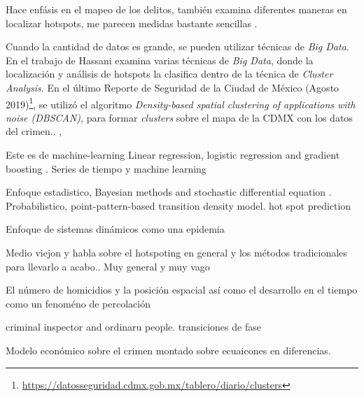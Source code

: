 \documentclass[onecolumn,12pt,letterpaper]{article}
\begin{document}
Hace enfásis en el mapeo de los delitos, también examina diferentes maneras en localizar hotspots, me parecen medidas bastante sencillas \cite{ratcliffe_crime_2010}. 


Cuando la cantidad de datos es grande, se pueden utilizar técnicas de \textit{Big Data}. En el trabajo de Hassani\cite{hassani_review_2016} examina varias técnicas de \textit{Big Data}, donde  la localización y análisis de hotspots la clasifica dentro de la técnica de \textit{Cluster Analysis}. En el último Reporte de Seguridad de la Ciudad de México (Agosto 2019)\footnote{\url{https://datosseguridad.cdmx.gob.mx/tablero/diario/clusters}}, se utilizó el algoritmo \textit{Density-based spatial clustering of applications with noise (DBSCAN)}, para formar \textit{clusters} sobre el mapa de la CDMX con los datos del crimen.\cite{noauthor_datos_nodate}.  \cite{noauthor_big_nodate} \cite{chen_crime_2004},


Este es de machine-learning \cite{alves_crime_2018}
Linear regression, logistic regression and gradient boosting \cite{ingilevich_crime_2018}. Series de tiempo y machine learning \cite{wang_learning_2013}


Enfoque estadistico\cite{noauthor_bayesian_nodate}, Bayesian methods and stochastic differential equation \cite{mohler_geographic_2012}. Probabilistico, point-pattern-based transition density model. hot spot prediction\cite{liu_criminal_2003} 

Enfoque de sistemas dinámicos como una epidemia \cite{gonzalez-parra_mathematical_2018} \cite{srivastav_modeling_2019} \cite{mcmillon_modeling_2014}


Medio viejon y habla sobre el hotspoting en general y los métodos tradicionales para llevarlo a acabo.\cite{bowers_prospective_2004}. Muy general y muy vago \cite{butorac_geography_2017}


El número de homicidios y la posición espacial así como el desarrollo en el tiempo como un fenoméno de percolación \cite{alves_spatial_2015} 

criminal inspector and ordinaru people. transiciones de fase \cite{perc_understanding_2013} 

Modelo económico sobre el crimen montado sobre ecuaicones en diferencias. \cite{freeman_spatial_1996}



\end{document}
